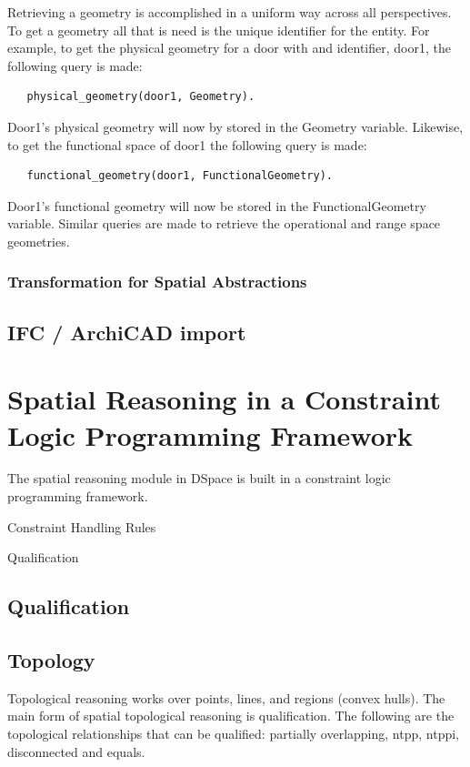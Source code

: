 \documentclass[12pt]{ucthesis}
\begin{document}
Retrieving a geometry is accomplished in a uniform way across all perspectives. To get a geometry all that is need is the unique identifier for the entity. For example, to get the physical geometry for a door with and identifier, door1, the following query is made:

\begin{verbatim}
   physical_geometry(door1, Geometry).
\end{verbatim} 
Door1's physical geometry will now by stored in the Geometry variable. Likewise, to get the functional space of door1 the following query is made:
\begin{verbatim}
   functional_geometry(door1, FunctionalGeometry).
\end{verbatim}
Door1's functional geometry will now be stored in the FunctionalGeometry variable. Similar queries are made to retrieve the operational and range space geometries.

\subsubsection{Transformation for Spatial Abstractions}


\subsection{IFC / ArchiCAD import}


\section{Spatial Reasoning in a Constraint Logic Programming Framework}
The spatial reasoning module in DSpace is built in a constraint logic programming framework. 

Constraint Handling Rules

Qualification

\subsection{Qualification}

\subsection{Topology}
Topological reasoning works over points, lines, and regions (convex hulls). The main form of spatial topological reasoning is qualification. The following are the topological relationships that can be qualified: partially overlapping, ntpp, ntppi, disconnected and equals. 
\end{document}
